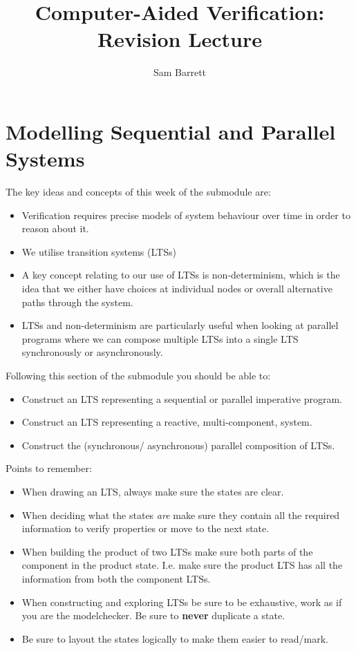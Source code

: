 \documentclass{article}
\title{Computer-Aided Verification: Revision Lecture}
\author{Sam Barrett}
\begin{document}
    \maketitle
    \section{Modelling Sequential and Parallel Systems}

    The key ideas and concepts of this week of the submodule are:
    \begin{itemize}
        \item Verification requires precise models of system behaviour over time in order to reason about it.
        \item We utilise transition systems (LTSs)
        \item A key concept relating to our use of LTSs is non-determinism, which is the idea that we either have choices at individual nodes or overall alternative paths through the system.
        \item LTSs and non-determinism are particularly useful when looking at parallel programs where we can compose multiple LTSs into a single LTS synchronously or asynchronously.
    \end{itemize}

    Following this section of the submodule you should be able to:

    \begin{itemize}
        \item Construct an LTS representing a sequential or parallel imperative program.
        \item Construct an LTS representing a reactive, multi-component, system.
        \item Construct the (synchronous/ asynchronous) parallel composition of LTSs.
    \end{itemize}

    
    Points to remember:

    \begin{itemize}
        \item When drawing an LTS, always make sure the states are clear.
        \item When deciding what the states \textit{are} make sure they contain all the required information to verify properties or move to the next state.
        \item When building the product of two LTSs make sure both parts of the component in the product state. I.e. make sure the product LTS has all the information from both the component LTSs.
        \item When constructing and exploring LTSs be sure to be exhaustive, work as if you are the modelchecker. Be sure to \textbf{never} duplicate a state.
        \item Be sure to layout the states logically to make them easier to read/mark.
    \end{itemize}
\end{document}
